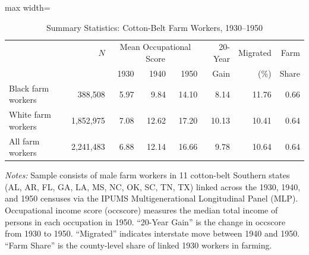 \begin{table}[H]
\centering
\caption{Summary Statistics: Cotton-Belt Farm Workers, 1930--1950}
\label{tab:summary}
\begin{threeparttable}
\begin{adjustbox}{max width=\textwidth}
\begin{tabular}{lrrrrrrr}
\toprule
 & $N$ & \multicolumn{3}{c}{Mean Occupational Score} & 20-Year & Migrated & Farm \\
 &  & 1930 & 1940 & 1950 & Gain & (\%) & Share \\
\midrule
Black farm workers & 388,508 & 5.97 & 9.84 & 14.10 & 8.14 & 11.76 & 0.66 \\
White farm workers & 1,852,975 & 7.08 & 12.62 & 17.20 & 10.13 & 10.41 & 0.64 \\
All farm workers & 2,241,483 & 6.88 & 12.14 & 16.66 & 9.78 & 10.64 & 0.64 \\
\bottomrule
\end{tabular}
\end{adjustbox}
\begin{tablenotes}[flushleft]
\small
\item \textit{Notes:} Sample consists of male farm workers in 11 cotton-belt Southern states (AL, AR, FL, GA, LA, MS, NC, OK, SC, TN, TX) linked across the 1930, 1940, and 1950 censuses via the IPUMS Multigenerational Longitudinal Panel (MLP). Occupational income score (occscore) measures the median total income of persons in each occupation in 1950. ``20-Year Gain'' is the change in occscore from 1930 to 1950. ``Migrated'' indicates interstate move between 1940 and 1950. ``Farm Share'' is the county-level share of linked 1930 workers in farming.
\end{tablenotes}
\end{threeparttable}
\end{table}

